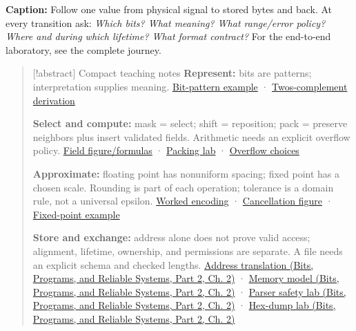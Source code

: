 
\textbf{Caption:} Follow one value from physical signal to stored bytes and back. At every transition ask: \emph{Which bits? What meaning? What range/error policy? Where and during which lifetime? What format contract?} For the end-to-end laboratory, see {the complete journey}.

\begin{quote}
{[}!abstract{]} Compact teaching notes \textbf{Represent:} bits are patterns; interpretation supplies meaning. \hyperref[01-foundations-i-ch001-one-bit-several-bits-and-an-interpretation]{Bit-pattern example} · \hyperref[01-foundations-i-ch001-why-invert-and-add-one-works]{Two\textquotesingle s-complement derivation}

\textbf{Select and compute:} mask = select; shift = reposition; pack = preserve neighbors plus insert validated fields. Arithmetic needs an explicit overflow policy. \hyperref[01-foundations-i-ch001-fields-select-normalize-replace]{Field figure/formulas} · \hyperref[01-foundations-i-ch001-test-the-packed-meaning]{Packing lab} · \hyperref[01-foundations-i-ch001-choose-the-overflow-policy-before-calculating]{Overflow choices}

\textbf{Approximate:} floating point has nonuniform spacing; fixed point has a chosen scale. Rounding is part of each operation; tolerance is a domain rule, not a universal epsilon. \hyperref[01-foundations-i-ch001-encode-10.625-then-decode-13.25]{Worked encoding} · \hyperref[01-foundations-i-ch001-cancellation-can-expose-errors-made-earlier]{Cancellation figure} · \hyperref[01-foundations-i-ch001-a-fixed-ruler-for-fractional-values]{Fixed-point example}

\textbf{Store and exchange:} address alone does not prove valid access; alignment, lifetime, ownership, and permissions are separate. A file needs an explicit schema and checked lengths. \href{../01-Bits-Programs-and-Reliable-Systems-P02/main.pdf\#nameddest=01-foundations-i-ch002-virtual-memory-translates-page-identity}{Address translation (Bits, Programs, and Reliable Systems, Part 2, Ch. 2)} · \href{../01-Bits-Programs-and-Reliable-Systems-P02/main.pdf\#nameddest=01-foundations-i-ch002-storage-lifetime-ownership-and-placement-are-different-axes}{Memory model (Bits, Programs, and Reliable Systems, Part 2, Ch. 2)} · \href{../01-Bits-Programs-and-Reliable-Systems-P02/main.pdf\#nameddest=01-foundations-i-ch002-validate-lengths-before-performing-the-arithmetic-they-request}{Parser safety lab (Bits, Programs, and Reliable Systems, Part 2, Ch. 2)} · \href{../01-Bits-Programs-and-Reliable-Systems-P02/main.pdf\#nameddest=01-foundations-i-ch002-read-a-dump-by-reversing-the-contract}{Hex-dump lab (Bits, Programs, and Reliable Systems, Part 2, Ch. 2)}
\end{quote}


